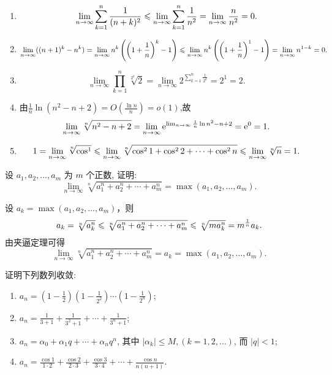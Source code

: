 \begin{solution}
    \begin{enumerate}[(1)]
        \item $$\lim_{n\to\infty} \sum_{k=1}^{n} \frac{1}{(n+k)^2} \leqslant \lim_{n\to\infty} \sum_{k=1}^{n} \frac{1}{n^2} = \lim_{n\to\infty} \frac{n}{n^2} = 0.$$
        \item $$\lim_{n\to\infty} ((n+1)^k - n^k) = \lim_{n\to\infty} n^k \left( \left( 1 + \frac{1}{n} \right)^k - 1 \right) \leqslant \lim_{n\to\infty} n^k \left( \left( 1 + \frac{1}{n} \right)^1 - 1 \right)  = \lim_{n\to\infty} n^{1-k} = 0.$$
        \item $$\lim_{n\to\infty} \prod_{k=1}^{n} \sqrt[2^k]{2} = \lim_{n\to\infty} 2^{\sum_{k=1}^{n} \frac{1}{2^k}} = 2^1 = 2.$$
        \item 由$\frac{1}{n} \ln(n^2 - n + 2) = O\left( \frac{\ln n}{n} \right) = o(1)$,故
              $$\lim_{n\to\infty} \sqrt[n]{n^2 - n + 2} = \lim_{n\to\infty} \mathrm{e}^{\lim_{n\to\infty} \frac{1}{n} \ln n^2 - n + 2} = \mathrm{e}^0 = 1.$$
        \item $$1 = \lim_{n\to\infty} \sqrt[n]{\cos^1} \leqslant \lim_{n\to\infty} \sqrt[n]{\cos^2 1 + \cos^2 2 + \cdots + \cos^2 n} \leqslant \lim_{n\to\infty} \sqrt[n]{n} = 1.$$
    \end{enumerate}
\end{solution}



\begin{exercise}[1.2.16]
    设 $a_1, a_2, \ldots, a_m$ 为 $m$ 个正数, 证明:
    $$
    \lim_{n\to\infty} \sqrt[n]{a_1^n + a_2^n + \cdots + a_m^n} = \max(a_1, a_2, \ldots, a_m).
    $$
\end{exercise}

\begin{solution}
    设 $a_k = \max(a_1, a_2, \ldots, a_m)$，则
    $$
        a_k = \sqrt[n]{a_k^n} \leqslant \sqrt[n]{a_1^n + a_2^n + \cdots + a_m^n} \leqslant \sqrt[n]{m a_k^n} = m^{\frac{1}{n}} a_k.
    $$
    由夹逼定理可得
    $$
        \lim_{n\to\infty} \sqrt[n]{a_1^n + a_2^n + \cdots + a_m^n} = a_k = \max(a_1, a_2, \ldots, a_m).
    $$
\end{solution}

    \begin{exercise}[1.2.17]
    证明下列数列收敛:
    \begin{enumerate}[(1)]
        \item $a_n = \left(1 - \frac{1}{2}\right) \left(1 - \frac{1}{2^2}\right) \cdots \left(1 - \frac{1}{2^n}\right)$;
        \item $a_n = \frac{1}{3+1} + \frac{1}{3^2+1} + \cdots + \frac{1}{3^n+1}$;
        \item $a_n = \alpha_0 + \alpha_1 q + \cdots + \alpha_n q^n$, 其中 $|\alpha_k| \le M, (k=1, 2, \ldots)$, 而 $|q| < 1$;
        \item $a_n = \frac{\cos 1}{1 \cdot 2} + \frac{\cos 2}{2 \cdot 3} + \frac{\cos 3}{3 \cdot 4} + \cdots + \frac{\cos n}{n(n+1)}$.
    \end{enumerate}
\end{exercise}

